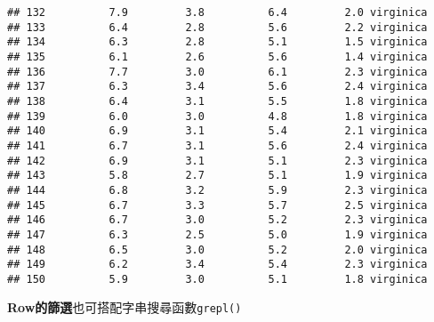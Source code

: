 \documentclass[]{book}
\newenvironment{Shaded}{\begin{snugshade}}{\end{snugshade}}
\newcommand{\KeywordTok}[1]{\textcolor[rgb]{0.13,0.29,0.53}{\textbf{{#1}}}}
\newcommand{\StringTok}[1]{\textcolor[rgb]{0.31,0.60,0.02}{{#1}}}
\newcommand{\NormalTok}[1]{{#1}}
\begin{document}
\begin{verbatim}
## 132          7.9         3.8          6.4         2.0 virginica
## 133          6.4         2.8          5.6         2.2 virginica
## 134          6.3         2.8          5.1         1.5 virginica
## 135          6.1         2.6          5.6         1.4 virginica
## 136          7.7         3.0          6.1         2.3 virginica
## 137          6.3         3.4          5.6         2.4 virginica
## 138          6.4         3.1          5.5         1.8 virginica
## 139          6.0         3.0          4.8         1.8 virginica
## 140          6.9         3.1          5.4         2.1 virginica
## 141          6.7         3.1          5.6         2.4 virginica
## 142          6.9         3.1          5.1         2.3 virginica
## 143          5.8         2.7          5.1         1.9 virginica
## 144          6.8         3.2          5.9         2.3 virginica
## 145          6.7         3.3          5.7         2.5 virginica
## 146          6.7         3.0          5.2         2.3 virginica
## 147          6.3         2.5          5.0         1.9 virginica
## 148          6.5         3.0          5.2         2.0 virginica
## 149          6.2         3.4          5.4         2.3 virginica
## 150          5.9         3.0          5.1         1.8 virginica
\end{verbatim}

\textbf{Row的篩選}也可搭配字串搜尋函數\texttt{grepl()}

\begin{Shaded}
\end{Shaded}
\end{document}
